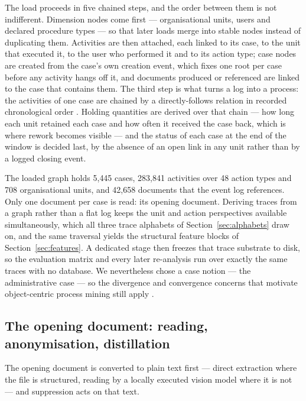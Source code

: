 The load proceeds in five chained steps, and the order between them is not indifferent.
Dimension nodes come first --- organisational units, users and declared procedure types --- so
that later loads merge into stable nodes instead of duplicating them. Activities are then
attached, each linked to its case, to the unit that executed it, to the user who performed it
and to its action type; case nodes are created from the case's own creation event, which fixes
one root per case before any activity hangs off it, and documents produced or referenced are
linked to the case that contains them. The third step is what turns a log into a process: the
activities of one case are chained by a directly-follows relation in recorded chronological
order \citep{esser2021ekg}. Holding quantities are derived over that chain --- how long each
unit retained each case and how often it received the case back, which is where rework becomes
visible --- and the status of each case at the end of the window is decided last, by the absence
of an open link in any unit rather than by a logged closing event.

The loaded graph holds 5{,}445 cases, 283{,}841 activities over 48 action types and 708
organisational units, and 42{,}658 documents that the event log references. Only one document
per case is read: its opening document. Deriving traces from a graph rather than a flat log
keeps the unit and action perspectives available simultaneously, which all three trace alphabets
of Section~\ref{sec:alphabets} draw on, and the same traversal yields the structural feature
blocks of Section~\ref{sec:features}. A dedicated stage then freezes that trace substrate to
disk, so the evaluation matrix and every later re-analysis run over exactly the same traces with
no database. We nevertheless chose a case notion --- the administrative case --- so the
divergence and convergence concerns that motivate object-centric process mining still apply
\citep{vanderaalst2019ocpm}.

\subsection{The opening document: reading, anonymisation, distillation}\label{sec:anon}

The opening document is converted to plain text first --- direct extraction where the file is
structured, reading by a locally executed vision model where it is not --- and suppression acts
on that text.

